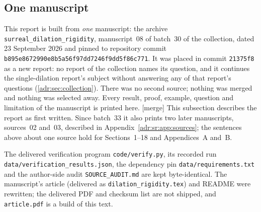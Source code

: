 \documentclass[11pt,letterpaper]{article}
\numberwithin{equation}{section}
\theoremstyle{definition}
\theoremstyle{remark}
\newcommand{\rpath}[1]{\nolinkurl{#1}}%
\newcommand{\mtag}{\textup{[merge]}}%
\begin{document}
\subsection{One manuscript}\label{adr:app:onesource}

This report is built from \emph{one} manuscript: the archive
\texttt{surreal\_dilation\_rigidity}, manuscript~08 of batch~30 of the
collection, dated 23 September 2026 and pinned to repository commit
\nolinkurl{b895e8672990e8b5a56f97dd7246f9dd5f86c771}. It was placed in
commit \texttt{21375f8} as a new report: no report of the collection names
its question, and it continues the single-dilation report's subject without
answering any of that report's questions (\cref{adr:sec:collection}). There
was no second source; nothing was merged and nothing was selected away.
Every result, proof, example, question and limitation of the manuscript is
printed here.
\mtag{} This subsection describes the report as first written. Since batch~33
it also prints two later manuscripts, sources~02 and~03, described in
Appendix~\ref{adr:sr:app:sources}; the sentences above about one source hold
for Sections~1--18 and Appendices~A and~B.

The delivered verification program \rpath{code/verify.py}, its recorded
run \rpath{data/verification_results.json}, the dependency pin
\rpath{data/requirements.txt} and the author-side audit
\rpath{SOURCE_AUDIT.md} are kept byte-identical. The manuscript's article
(delivered as \texttt{dilation\_rigidity.tex}) and README were rewritten;
the delivered PDF and checksum list are not shipped, and \texttt{article.pdf}
is a build of this text.
\end{document}
